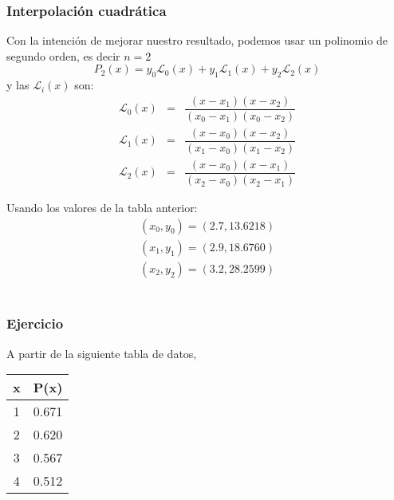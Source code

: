 \begin{frame}
\frametitle{Interpolación cuadrática}
Con la intención de mejorar nuestro resultado, podemos usar un polinomio de segundo orden, es decir $n=2$
\[P_{2}(x) = y_{0}\mathcal{L}_{0}(x) + y_{1} \mathcal{L}_{1}(x) + y_{2} \mathcal{L}_{2}(x) \]
y las $\mathcal{L}_{i}(x)$ son:
\begin{eqnarray*}
\mathcal{L}_{0}(x) &=& \dfrac{(x-x_{1})(x-x_{2})}{(x_{0}-x_{1})(x_{0}-x_{2})} \\
\mathcal{L}_{1}(x) &=& \dfrac{(x-x_{0})(x-x_{2})}{(x_{1}-x_{0})(x_{1}-x_{2})} \\
\mathcal{L}_{2}(x) &=& \dfrac{(x-x_{0})(x-x_{1})}{(x_{2}-x_{0})(x_{2}-x_{1})} 
\end{eqnarray*}
\end{frame}
\begin{frame}
Usando los valores de la tabla anterior:
\begin{eqnarray*}
(x_{0}, y_{0}) = (2.7, 13.6218) \\
(x_{1}, y_{1}) = (2.9, 18.6760) \\
(x_{2}, y_{2}) = (3.2, 28.2599)
\end{eqnarray*}
\\
\bigskip
{}
\end{frame}
\begin{frame}
\frametitle{Ejercicio}
\begin{minipage}{5cm}
A partir de la siguiente tabla de datos,
\\
\medskip
\begin{center}
\begin{tabular}{c | c}
x & P(x) \\
\hline 1 & 0.671 \\
\hline 2 & 0.620 \\
\hline 3 & 0.567 \\
\hline 4 & 0.512
\end{tabular}
\end{center}
\end{minipage}
\hspace{0.3cm}
\end{frame}
